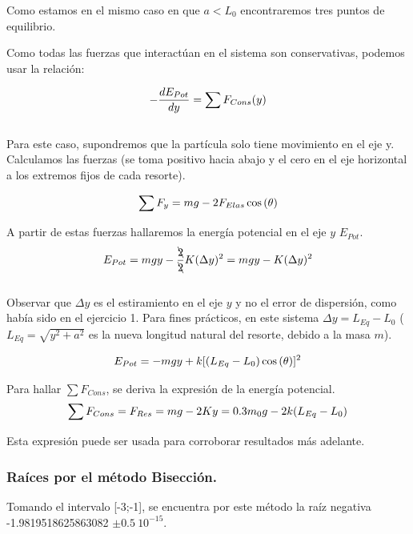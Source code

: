 \documentclass[10pt,a4paper]{article}
\begin{document}
Como estamos en el mismo caso en que $a<L_{0}$ encontraremos tres puntos de equilibrio.

Como todas las fuerzas que interactúan en el sistema son conservativas, podemos usar la relación:

\begin{equation}
    \notag-\dfrac{dE_{Pot}}{dy}= \sum{F_{Cons}(y)}
\end{equation}
\\

Para este caso, supondremos que la partícula solo tiene movimiento en el eje y. Calculamos las fuerzas (se toma positivo hacia abajo y el cero en el eje horizontal a los extremos fijos de cada resorte).

\begin{equation}
\notag \sum{F_{y}}=mg-2F_{Elas}\cos{(\theta)}
\end{equation}

A partir de estas fuerzas hallaremos la energía potencial en el eje $y$ $E_{Pot}$.
\\

\begin{equation}
\notag E_{Pot} = mgy-\dfrac{\bcancel{2}}{\bcancel{2}}K(\Delta y)^{2}=mgy-K(\Delta y)^{2}
\end{equation}
\\

Observar que $\Delta y$ es el estiramiento en el eje $y$ y no el error de dispersión, como había sido en el ejercicio 1. Para fines prácticos, en este sistema $\Delta y=L_{Eq}-L_{0}$ ($L_{Eq}=\sqrt{y^{2}+a^{2}}$ es la nueva longitud natural del resorte, debido a la masa $m$).

\begin{equation}
\notag E_{Pot}=-mgy+k[(L_{Eq}-L_{0})\cos{(\theta)}]^{2}
\end{equation}


Para hallar $\sum{F_{Cons}}$, se deriva la expresión de la energía potencial.
\\

\begin{equation}
\notag \sum{F_{Cons}}=F_{Res}=mg-2Ky=0.3m_{0}g-2k(L_{Eq}-L_{0})
\end{equation}

Esta expresión puede ser usada para corroborar resultados más adelante.\\

\subsubsection{Raíces por el método Bisección.}
Tomando el intervalo [-3;-1], se encuentra por este método la raíz negativa -1.9819518625863082 $\pm 0.5\:10^{-15}$.
\end{document}
